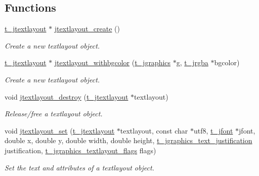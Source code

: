\subsection*{Functions}
\begin{DoxyCompactItemize}
\item 
\hyperlink{group__jgraphics_ga45f6bda6903290bd6040f79fec89872b}{t\_\-jtextlayout} $\ast$ \hyperlink{group__textlayout_gaf615694d8a34728f84092838b91e2a4a}{jtextlayout\_\-create} ()
\begin{DoxyCompactList}\small\item\em Create a new textlayout object. \item\end{DoxyCompactList}\item 
\hyperlink{group__jgraphics_ga45f6bda6903290bd6040f79fec89872b}{t\_\-jtextlayout} $\ast$ \hyperlink{group__textlayout_ga97bb1d3ac51e09a5f2c22487a6e170e0}{jtextlayout\_\-withbgcolor} (\hyperlink{group__jgraphics_ga4bf27bd7e21a59a427481b909d4656e7}{t\_\-jgraphics} $\ast$g, \hyperlink{structt__jrgba}{t\_\-jrgba} $\ast$bgcolor)
\begin{DoxyCompactList}\small\item\em Create a new textlayout object. \item\end{DoxyCompactList}\item 
void \hyperlink{group__textlayout_ga3bd3ba8982b5b42bcf8870515b708303}{jtextlayout\_\-destroy} (\hyperlink{group__jgraphics_ga45f6bda6903290bd6040f79fec89872b}{t\_\-jtextlayout} $\ast$textlayout)
\begin{DoxyCompactList}\small\item\em Release/free a textlayout object. \item\end{DoxyCompactList}\item 
void \hyperlink{group__textlayout_gac9d7684376b82def890308ca2ab7ff9e}{jtextlayout\_\-set} (\hyperlink{group__jgraphics_ga45f6bda6903290bd6040f79fec89872b}{t\_\-jtextlayout} $\ast$textlayout, const char $\ast$utf8, \hyperlink{group__jfont_ga75f83f853e52af957c799723cac89ae5}{t\_\-jfont} $\ast$jfont, double x, double y, double width, double height, \hyperlink{group__jgraphics_ga3519fa317c6811b619af2d70e3c1eca7}{t\_\-jgraphics\_\-text\_\-justification} justification, \hyperlink{group__textlayout_ga9b00aebce7fb7877e7e4c13e18b38f08}{t\_\-jgraphics\_\-textlayout\_\-flags} flags)
\begin{DoxyCompactList}\small\item\em Set the text and attributes of a textlayout object. \item\end{DoxyCompactList}\item 

\end{DoxyCompactItemize}
